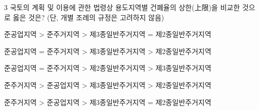\begin{question}{3}
국토의 계획 및 이용에 관한 법령상 용도지역별 건폐율의 상한(上限)을 비교한 것으로 옳은 것은? (단, 개별 조례의 규정은 고려하지 않음)
\begin{choices}
  \item 준공업지역 > 준주거지역 > 제3종일반주거지역 = 제2종일반주거지역
  \item 준공업지역 = 준주거지역 > 제3종일반주거지역 > 제2종일반주거지역
  \item 준공업지역 = 준주거지역 > 제2종일반주거지역 > 제3종일반주거지역
  \item 준주거지역 > 준공업지역 > 제3종일반주거지역 > 제2종일반주거지역
  \item 준주거지역 > 준공업지역 > 제3종일반주거지역 = 제2종일반주거지역
\end{choices}
\end{question}
